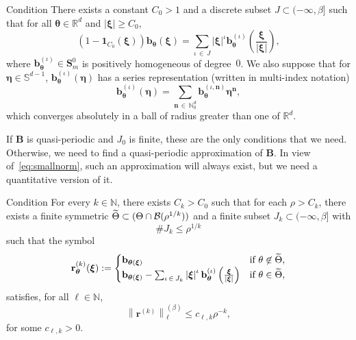 \documentclass[10pt]{amsart}
\theoremstyle{definition}\newtheorem{defi}[theo]{Definition}\newtheorem{rema}[theo]{Remark}\newtheorem{exam}[theo]{Example}\newtheorem{nota}[theo]{Notation}
\newcommand{\R}{\mathbb R}
\newcommand{\N}{\mathbb N}
\newcommand{\BBS}{\mathbb S}
\newcommand{\CB}{\mathcal{B}}
\newcommand{\btheta}{\boldsymbol \theta}
\newcommand{\bxi}{\boldsymbol \xi}
\newcommand{\boeta}{\boldsymbol \eta}
\newcommand{\bone}{\boldsymbol 1}
\newcommand{\BB}{\mathbf B}
\newcommand{\BS}{\mathbf S}
\newcommand{\bbb}{\mathbf b}
\newcommand{\br}{\mathbf r}
\newcommand{\bn}{\mathbf n}
\newcommand{\abs}[1]{\left\lvert #1 \right\rvert}
\newcommand{\snorm}[3]{\left\| #1\right\|_{#3}^{(#2)}}
\let\oldtilde\tilde
\renewcommand*{\tilde}[1]{\mathchoice{\widetilde{#1}}{\widetilde{#1}}{\oldtilde{#1}}{\oldtilde{#1}}}
\begin{document}
\begin{enonce}
{Condition}\label{condII}
There exists a constant $C_0 > 1$ and a discrete subset $J \subset (-\infty,\beta]$ such that for all $\btheta \in \R^d$ and $\abs \bxi \ge C_0$,
\begin{equation}
(1 - \bone_{C_0}(\bxi)) \bbb_{\btheta}(\bxi) = \sum_{\iota\,\in\,J}
\abs{\bxi}^\iota
\bbb_{\btheta}^{(\iota)}\left(\frac{\bxi}{\abs \bxi} \right),
\end{equation}
where $\bbb_{\btheta}^{(\iota)} \in \BS_m^0$ is positively homogeneous of degree~$0$. We also suppose that for $\boeta \in \BBS^{d-1}$, $\bbb_{\btheta}^{(\iota)}(\boeta)$ has a series representation (written in multi-index notation)
\begin{equation}
\bbb_{\btheta}^{(\iota)}(\boeta) = \sum_{\bn\,\in\,\N_0^d}
\bbb_{\btheta}^{(\iota,\bn)} \boeta^\bn,
\end{equation}
which converges absolutely in a ball of radius greater than one of $\R^d$.
\end{enonce}

If $\BB$ is quasi-periodic and $J_0$ is finite, these are the only conditions that we need. Otherwise, we need to find a quasi-periodic approximation of $\BB$. In view of~\eqref{eq:smallnorm}, such an approximation will always exist, but we need a quantitative version of it.

\begin{enonce}
{Condition}\label{condIII}
For every $k \in \N$, there exists $C_k > C_0$ such that for each $\rho > C_k$, there exists a finite symmetric $\tilde \Theta \subset (\Theta \cap \CB(\rho^{1/k}))$ and a finite subset $J_k
\subset (-\infty,\beta]$ with
\begin{equation}\label{eq:cardtildej}
\# J_k \le \rho^{1/k}
\end{equation}
such that the symbol
\begin{equation}\label{eq:symbolrb2}
\br_{\btheta}^{(k)}(\bxi) :=
\begin{cases}
\bbb_{\btheta(\bxi)} & \text{if } \theta \not \in \tilde \Theta, \\
\bbb_{\btheta(\bxi)} - \sum_{\iota\,\in\,J_k} \abs{\bxi}^{\iota}
\bbb_{\btheta}^{(\iota)}\left(\frac{\bxi}{\abs \bxi} \right) & \text{if } \theta \in \tilde \Theta,
\end{cases}
\end{equation}
satisfies, for all $\ell \in \N$,
\begin{equation}\label{eq:smallseminorm}
\snorm{\br^{(k)}}{\beta}{\ell} \le c_{\ell,k} \rho^{-k},
\end{equation}
for some $c_{\ell,k} > 0$.
\end{enonce}
\end{document}
